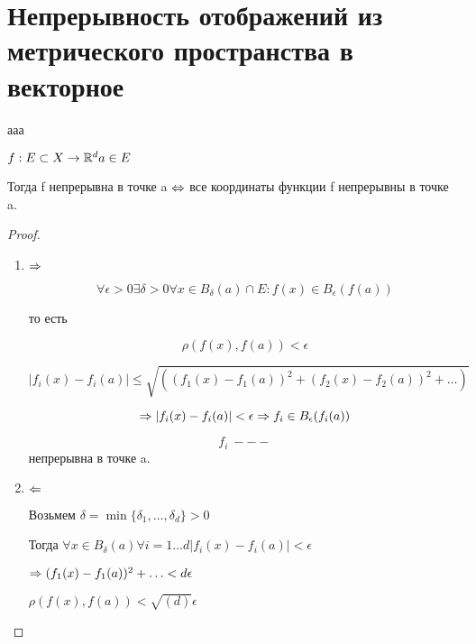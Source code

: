 ﻿\section{Непрерывность отображений из метрического пространства в векторное}

\begin{theorem}{ааа}

 $f: E \subset X \to \mathbb{R}^{d} a \in E$

 Тогда f  непрерывна в точке a $\Leftrightarrow$ все координаты функции f непрерывны в точке a.
 
\end{theorem}

\begin{proof}
 \begin{enumerate}
 \item $\Rightarrow$

  $$\forall \epsilon > 0 \exists \delta > 0 \forall x \in B_{\delta}(a) \cap E: f(x) \in B_{\epsilon}(f(a)) $$

  то есть 

  $$\rho(f(x), f(a)) < \epsilon$$

  $$|f_i(x) - f_i(a)| \leqslant \sqrt{((f_1(x) - f_1(a))^2 + (f_2(x) - f_2(a))^2 + \ldots)}$$

  $$\Rightarrow |f_i(x) - f_i(a)| < \epsilon \Rightarrow f_i \in B_{\epsilon}(f_i(a)) $$

  $$f_i ~---$$ непрерывна в точке a.
 \item $\Leftarrow$
  
  Возьмем $\delta = \min\{\delta_1, \ldots, \delta_d\} > 0$

  Тогда $\forall x \in B_{\delta}(a) \forall i = 1 \ldots d |f_i(x) - f_i(a)| < \epsilon$

  $\Rightarrow (f_1(x) - f_1(a))^2 + \ldots < d \epsilon$

 $\rho(f(x), f(a)) < \sqrt{(d)} \epsilon$ 
 
 \end{enumerate}
\end{proof}